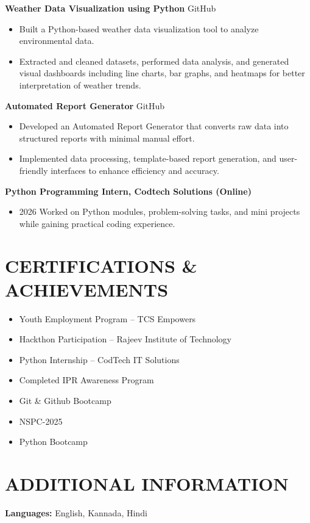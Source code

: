 \documentclass[9pt,a4paper]{extarticle}
\begin{document}
\noindent \textbf{Weather Data Visualization using Python} \hfill GitHub
\begin{itemize}[leftmargin=*, parsep=0pt, itemsep=1pt, topsep=1pt]
    \item Built a Python-based weather data visualization tool to analyze environmental data.
    \item Extracted and cleaned datasets, performed data analysis, and generated visual dashboards including line charts, bar graphs, and heatmaps for better interpretation of weather trends.
\end{itemize}
\vspace{2pt}
\noindent \textbf{Automated Report Generator} \hfill GitHub
\begin{itemize}[leftmargin=*, parsep=0pt, itemsep=1pt, topsep=1pt]
    \item Developed an Automated Report Generator that converts raw data into structured reports with minimal manual effort.
    \item Implemented data processing, template-based report generation, and user-friendly interfaces to enhance efficiency and accuracy.
\end{itemize}
\vspace{2pt}
\noindent \textbf{Python Programming Intern, Codtech Solutions (Online)}
\begin{itemize}[leftmargin=*, parsep=0pt, itemsep=1pt, topsep=1pt]
    \item 2026 Worked on Python modules, problem-solving tasks, and mini projects while gaining practical coding experience.
\end{itemize}
\vspace{2pt}


\section*{CERTIFICATIONS \& ACHIEVEMENTS}

\begin{itemize}[leftmargin=*, parsep=0pt, itemsep=1pt, topsep=1pt]
    \item Youth Employment Program – TCS Empowers
    \item Hackthon Participation – Rajeev Institute of Technology
    \item Python Internship – CodTech IT Solutions
    \item Completed IPR Awareness Program
    \item Git \& Github Bootcamp
    \item NSPC-2025
    \item Python Bootcamp
\end{itemize}



\section*{ADDITIONAL INFORMATION}

\textbf{Languages:} English, Kannada, Hindi
\end{document}

